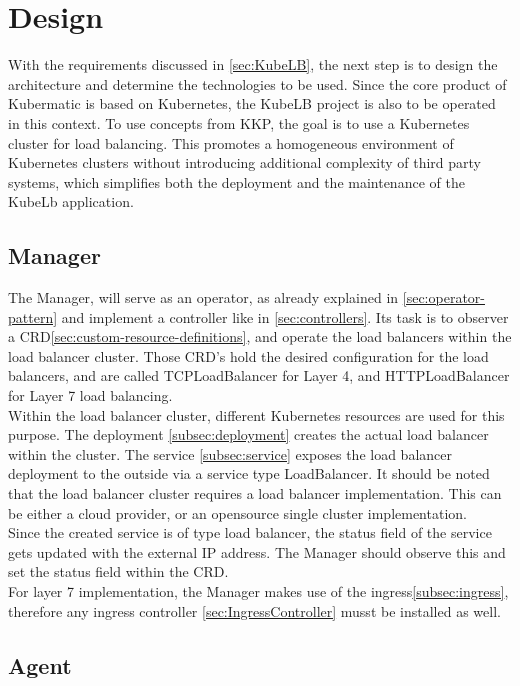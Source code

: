 \chapter{Design}

With the requirements discussed in \autoref{sec:KubeLB}, the next step is to design the architecture and determine the technologies to be used.
Since the core product of Kubermatic is based on Kubernetes, the KubeLB project is also to be operated in this context.
To use concepts from KKP, the goal is to use a Kubernetes cluster for load balancing.
This promotes a homogeneous environment of Kubernetes clusters without introducing additional complexity of third party systems, which simplifies both the deployment and the maintenance of the KubeLb application.

\section{Manager}\label{sec:manager}

The Manager, will serve as an operator, as already explained in \autoref{sec:operator-pattern} and implement a controller like in \autoref{sec:controllers}.
Its task is to observer a CRD\autoref{sec:custom-resource-definitions}, and operate the load balancers within the load balancer cluster.
Those CRD's hold the desired configuration for the load balancers, and are called TCPLoadBalancer for Layer 4, and HTTPLoadBalancer for Layer 7 load balancing.
\\
Within the load balancer cluster, different Kubernetes resources are used for this purpose.
The deployment \autoref{subsec:deployment} creates the actual load balancer within the cluster.
The service \autoref{subsec:service} exposes the load balancer deployment to the outside via a service type LoadBalancer.
It should be noted that the load balancer cluster requires a load balancer implementation.
This can be either a cloud provider, or an opensource single cluster implementation.
\\
Since the created service is of type load balancer, the status field of the service gets updated with the external IP address.
The Manager should observe this and set the status field within the CRD.
\\
For layer 7 implementation, the Manager makes use of the ingress\autoref{subsec:ingress}, therefore any ingress controller \autoref{sec:IngressController} musst be installed as well.

\section{Agent}\label{sec:agent}


